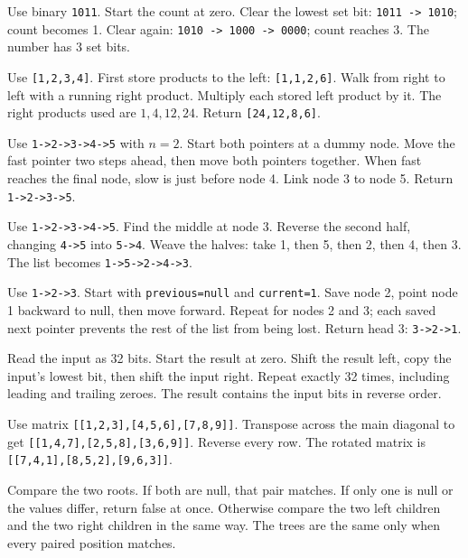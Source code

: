 \expandafter\def\csname lessontrace@49\endcsname{\visualtrace
  {Use binary \texttt{1011}. Start the count at zero.}
  {Clear the lowest set bit: \texttt{1011 -> 1010}; count becomes 1.}
  {Clear again: \texttt{1010 -> 1000 -> 0000}; count reaches 3.}
  {The number has \(3\) set bits.}}

\expandafter\def\csname lessontrace@50\endcsname{\visualtrace
  {Use \texttt{[1,2,3,4]}. First store products to the left: \texttt{[1,1,2,6]}.}
  {Walk from right to left with a running right product. Multiply each stored left product by it.}
  {The right products used are \(1,4,12,24\).}
  {Return \texttt{[24,12,8,6]}.}}

\expandafter\def\csname lessontrace@51\endcsname{\visualtrace
  {Use \texttt{1->2->3->4->5} with \(n=2\). Start both pointers at a dummy node.}
  {Move the fast pointer two steps ahead, then move both pointers together.}
  {When fast reaches the final node, slow is just before node 4. Link node 3 to node 5.}
  {Return \texttt{1->2->3->5}.}}

\expandafter\def\csname lessontrace@52\endcsname{\visualtrace
  {Use \texttt{1->2->3->4->5}. Find the middle at node 3.}
  {Reverse the second half, changing \texttt{4->5} into \texttt{5->4}.}
  {Weave the halves: take 1, then 5, then 2, then 4, then 3.}
  {The list becomes \texttt{1->5->2->4->3}.}}

\expandafter\def\csname lessontrace@53\endcsname{\visualtrace
  {Use \texttt{1->2->3}. Start with \texttt{previous=null} and \texttt{current=1}.}
  {Save node 2, point node 1 backward to null, then move forward.}
  {Repeat for nodes 2 and 3; each saved next pointer prevents the rest of the list from being lost.}
  {Return head 3: \texttt{3->2->1}.}}

\expandafter\def\csname lessontrace@54\endcsname{\visualtrace
  {Read the input as 32 bits. Start the result at zero.}
  {Shift the result left, copy the input's lowest bit, then shift the input right.}
  {Repeat exactly 32 times, including leading and trailing zeroes.}
  {The result contains the input bits in reverse order.}}

\expandafter\def\csname lessontrace@55\endcsname{\visualtrace
  {Use matrix \texttt{[[1,2,3],[4,5,6],[7,8,9]]}.}
  {Transpose across the main diagonal to get \texttt{[[1,4,7],[2,5,8],[3,6,9]]}.}
  {Reverse every row.}
  {The rotated matrix is \texttt{[[7,4,1],[8,5,2],[9,6,3]]}.}}

\expandafter\def\csname lessontrace@56\endcsname{\visualtrace
  {Compare the two roots. If both are null, that pair matches.}
  {If only one is null or the values differ, return false at once.}
  {Otherwise compare the two left children and the two right children in the same way.}
  {The trees are the same only when every paired position matches.}}

